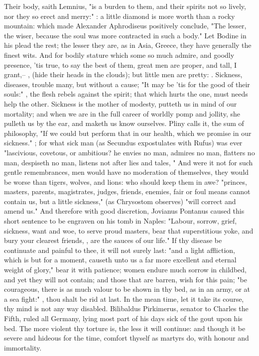{Their body, saith Lemnius, "is a burden to them, and their spirits not so lively, nor they so erect and merry:" : a little diamond is more worth than a rocky mountain: which made Alexander Aphrodiseus positively conclude, "The lesser, the wiser, because the soul was more contracted in such a body." Let Bodine in his  plead the rest; the lesser they are, as in Asia, Greece, they have generally the finest wits. And for bodily stature which some so much admire, and goodly presence, 'tis true, to say the best of them, great men are proper, and tall, I grant,-- , (hide their heads in the clouds); but  little men are pretty: . Sickness, diseases, trouble many, but without a cause; "It may be 'tis for the good of their souls:" , the flesh rebels against the spirit; that which hurts the one, must needs help the other. Sickness is the mother of modesty, putteth us in mind of our mortality; and when we are in the full career of worldly pomp and jollity, she pulleth us by the ear, and maketh us know ourselves. Pliny calls it, the sum of philosophy, "If we could but perform that in our health, which we promise in our sickness." ; for what sick man (as Secundus expostulates with Rufus) was ever "lascivious, covetous, or ambitious? he envies no man, admires no man, flatters no man, despiseth no man, listens not after lies and tales, \etc{}" And were it not for such gentle remembrances, men would have no moderation of themselves, they would be worse than tigers, wolves, and lions: who should keep them in awe? "princes, masters, parents, magistrates, judges, friends, enemies, fair or foul means cannot contain us, but a little sickness," (as Chrysostom observes) "will correct and amend us." And therefore with good discretion, Jovianus Pontanus caused this short sentence to be engraven on his tomb in Naples: "Labour, sorrow, grief, sickness, want and woe, to serve proud masters, bear that superstitious yoke, and bury your clearest friends, \etc{}, are the sauces of our life." If thy disease be continuate and painful to thee, it will not surely last: "and a light affliction, which is but for a moment, causeth unto us a far more excellent and eternal weight of glory,"  bear it with patience; women endure much sorrow in childbed, and yet they will not contain; and those that are barren, wish for this pain; "be courageous, there is as much valour to be shown in thy bed, as in an army, or at a sea fight:" , thou shalt be rid at last. In the mean time, let it take its course, thy mind is not any way disabled. Bilibaldus Pirkimerus, senator to Charles the Fifth, ruled all Germany, lying most part of his days sick of the gout upon his bed. The more violent thy torture is, the less it will continue: and though it be severe and hideous for the time, comfort thyself as martyrs do, with honour and immortality. }
